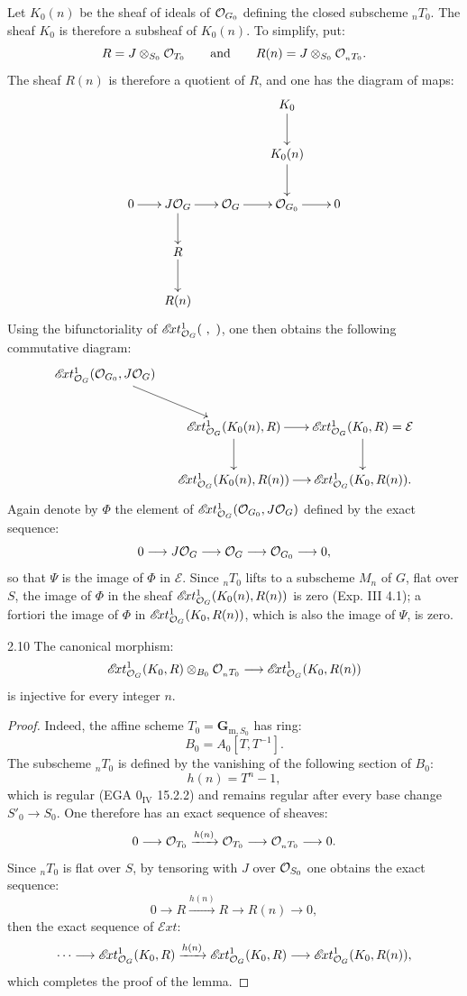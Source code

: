 Let $K_0(n)$ be the sheaf of ideals of $\mathcal{O}_{G_0}$ defining the closed subscheme ${}_nT_0$. The sheaf $K_0$ is therefore a subsheaf of $K_0(n)$. To simplify, put:
\[
R=J\otimes_{S_0}\mathcal{O}_{T_0}\qquad\text{and}\qquad R(n)=J\otimes_{S_0}\mathcal{O}_{{}_nT_0}.
\]
The sheaf $R(n)$ is therefore a quotient of $R$, and one has the diagram of maps:
\[
\xymatrix@C=18pt{&&&K_0\ar[d]&\\&&&K_0(n)\ar[d]&\\0\ar[r]&J\OO_G\ar[r]\ar[d]&\OO_G\ar[r]&\OO_{G_0}\ar[r]&0\\&R\ar[d]&&&\\&R(n)&&&}
\]
Using the bifunctoriality of $\mathscr{E}\!xt^1_{\mathcal{O}_G}(\ ,\ )$, one then obtains the following commutative diagram:
\[
\xymatrix@C=12pt{
\mathscr{E}\!xt^1_{\OO_G}(\OO_{G_0},J\OO_G)\ar[dr]&&\\
&\mathscr{E}\!xt^1_{\OO_G}(K_0(n),R)\ar[r]\ar[d]&\mathscr{E}\!xt^1_{\OO_G}(K_0,R)=\mathcal E\ar[d]\\
&\mathscr{E}\!xt^1_{\OO_G}(K_0(n),R(n))\ar[r]&\mathscr{E}\!xt^1_{\OO_G}(K_0,R(n)).
}
\]
Again denote by $\Phi$ the element of $\mathscr{E}\!xt^1_{\mathcal{O}_G}(\mathcal{O}_{G_0},J\mathcal{O}_G)$ defined by the exact sequence:
\[
0\longrightarrow J\mathcal{O}_G\longrightarrow\mathcal{O}_G\longrightarrow\mathcal{O}_{G_0}\longrightarrow0,
\]
so that $\Psi$ is the image of $\Phi$ in $\mathcal E$. Since ${}_nT_0$ lifts to a subscheme $M_n$ of $G$, flat over $S$, the image of $\Phi$ in the sheaf $\mathscr{E}\!xt^1_{\mathcal{O}_G}(K_0(n),R(n))$ is zero (Exp. III 4.1); a fortiori the image of $\Phi$ in $\mathscr{E}\!xt^1_{\mathcal{O}_G}(K_0,R(n))$, which is also the image of $\Psi$, is zero.
\begin{lemma}{2.10}\label{XV.2.10}
The canonical morphism:
\[
\mathscr{E}\!xt^1_{\mathcal{O}_G}(K_0,R)\otimes_{B_0}\mathcal{O}_{{}_nT_0}\longrightarrow\mathscr{E}\!xt^1_{\mathcal{O}_G}(K_0,R(n))
\]
is injective for every integer $n$.
\end{lemma}
\begin{proof}
Indeed, the affine scheme $T_0=\mathbf G_{\mathrm m,S_0}$ has ring:
\[
B_0=A_0[T,T^{-1}].
\]
The subscheme ${}_nT_0$ is defined by the vanishing of the following section of $B_0$:
\[
h(n)=T^n-1,
\]
which is regular (EGA $0_{\mathrm{IV}}$ 15.2.2) and remains regular after every base change $S'_0\to S_0$. One therefore has an exact sequence of sheaves:
\[
0\longrightarrow\mathcal{O}_{T_0}\xrightarrow{h(n)}\mathcal{O}_{T_0}\longrightarrow\mathcal{O}_{{}_nT_0}\longrightarrow0.
\]
Since ${}_nT_0$ is flat over $S$, by tensoring with $J$ over $\mathcal{O}_{S_0}$ one obtains the exact sequence:
\[
0\to R\xrightarrow{h(n)}R\to R(n)\to0,
\]
then the exact sequence of $\mathscr{E}\!xt$:
\[
\cdots\longrightarrow\mathscr{E}\!xt^1_{\mathcal{O}_G}(K_0,R)\xrightarrow{h(n)}\mathscr{E}\!xt^1_{\mathcal{O}_G}(K_0,R)\longrightarrow\mathscr{E}\!xt^1_{\mathcal{O}_G}(K_0,R(n)),
\]
which completes the proof of the lemma.
\end{proof}

